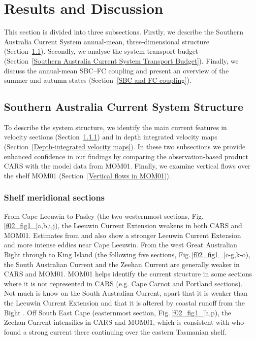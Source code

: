 \documentclass[preprint,3p,review,12pt]{elsarticle}
\begin{document}
\section{Results and Discussion} \label{Results and Discussion}
This section is divided into three subsections. Firstly, we describe the Southern Australia Current System annual-mean, three-dimensional structure (Section~\ref{Southern Australia Current System Structure}). Secondly, we analyse the system transport budget (Section~\ref{Southern Australia Current System Transport Budget}). Finally, we discuss the annual-mean SBC--FC coupling and present an overview of the summer and autumn states (Section~\ref{SBC and FC coupling}).

\subsection{Southern Australia Current System Structure} \label{Southern Australia Current System Structure}
To describe the system structure, we identify the main current features in velocity sections (Section~\ref{Shelf meridional sections}) and in depth integrated velocity maps (Section~\ref{Depth-integrated velocity maps}). In these two subsections we provide enhanced confidence in our findings by comparing the observation-based product CARS with the model data from MOM01. Finally, we examine vertical flows over the shelf MOM01 (Section~\ref{Vertical flows in MOM01}).

\subsubsection{Shelf meridional sections}\label{Shelf meridional sections}
From Cape Leeuwin to Pasley (the two westernmost sections, Fig.\,\ref{f02_fig1_}a,b,i,j), the Leeuwin Current Extension weakens in both CARS and MOM01. Estimates from \citet{Cresswell2004} and \citet{Cresswell1993} also show a stronger Leeuwin Current Extension and more intense eddies near Cape Leeuwin. From the west Great Australian Bight through to King Island (the following five sections, Fig.\,\ref{f02_fig1_}c-g,k-o), the South Australian Current and the Zeehan Current are generally weaker in CARS and MOM01. MOM01 helps identify the current structure in some sections where it is not represented in CARS (e.g. Cape Carnot and Portland sections). Not much is know on the South Australian Current, apart that it is weaker than the Leeuwin Current Extension \citep{Middleton2007} and that it is altered by coastal runoff from the Bight \citep{Rochford1986}. Off South East Cape (easternmost section, Fig.\,\ref{f02_fig1_}h,p), the Zeehan Current intensifies in CARS and MOM01, which is consistent with \citet{Oliver2016,Oliver2018b} who found a strong current there continuing over the eastern Tasmanian shelf.
\end{document}
